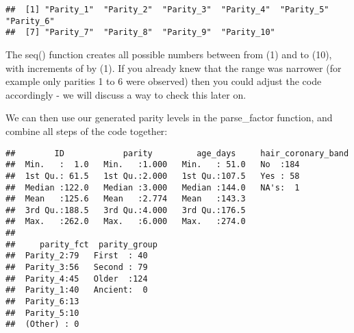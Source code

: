 \documentclass[
]{article}
\newenvironment{Shaded}{\begin{snugshade}}{\end{snugshade}}
\newcommand{\DataTypeTok}[1]{\textcolor[rgb]{0.13,0.29,0.53}{#1}}
\newcommand{\DecValTok}[1]{\textcolor[rgb]{0.00,0.00,0.81}{#1}}
\newcommand{\KeywordTok}[1]{\textcolor[rgb]{0.13,0.29,0.53}{\textbf{#1}}}
\newcommand{\NormalTok}[1]{#1}
\newcommand{\OperatorTok}[1]{\textcolor[rgb]{0.81,0.36,0.00}{\textbf{#1}}}
\newcommand{\StringTok}[1]{\textcolor[rgb]{0.31,0.60,0.02}{#1}}
\begin{document}
\begin{verbatim}
##  [1] "Parity_1"  "Parity_2"  "Parity_3"  "Parity_4"  "Parity_5"  "Parity_6" 
##  [7] "Parity_7"  "Parity_8"  "Parity_9"  "Parity_10"
\end{verbatim}

The seq() function creates all possible numbers between from (1) and to
(10), with increments of by (1). If you already knew that the range was
narrower (for example only parities 1 to 6 were observed) then you could
adjust the code accordingly - we will discuss a way to check this later
on.

We can then use our generated parity levels in the parse\_factor
function, and combine all steps of the code together:

\begin{Shaded}
\end{Shaded}

\begin{verbatim}
##        ID            parity         age_days     hair_coronary_band
##  Min.   :  1.0   Min.   :1.000   Min.   : 51.0   No  :184          
##  1st Qu.: 61.5   1st Qu.:2.000   1st Qu.:107.5   Yes : 58          
##  Median :122.0   Median :3.000   Median :144.0   NA's:  1          
##  Mean   :125.6   Mean   :2.774   Mean   :143.3                     
##  3rd Qu.:188.5   3rd Qu.:4.000   3rd Qu.:176.5                     
##  Max.   :262.0   Max.   :6.000   Max.   :274.0                     
##                                                                    
##     parity_fct  parity_group
##  Parity_2:79   First  : 40  
##  Parity_3:56   Second : 79  
##  Parity_4:45   Older  :124  
##  Parity_1:40   Ancient:  0  
##  Parity_6:13                
##  Parity_5:10                
##  (Other) : 0
\end{verbatim}
\end{document}
